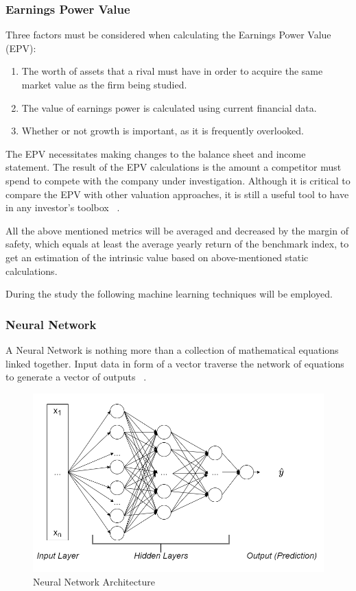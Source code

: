\documentclass{imc-inf}
\begin{document}
\subsubsection{Earnings Power Value}
Three factors must be considered when calculating the Earnings Power Value (EPV):

\begin{enumerate}
	\item The worth of assets that a rival must have in order to acquire the same market value as the firm being studied.
	\item The value of earnings power is calculated using current financial data.
	\item Whether or not growth is important, as it is frequently overlooked.
\end{enumerate}

The EPV necessitates making changes to the balance sheet and income statement. The result of the EPV calculations is the amount a competitor must spend to compete with the company under investigation. Although it is critical to compare the EPV with other valuation approaches, it is still a useful tool to have in any investor's toolbox ~\cite{epv}.

All the above mentioned metrics will be averaged and decreased by the margin of safety, which equals at least the average yearly return of the benchmark index, to get an estimation of the intrinsic value based on above-mentioned static calculations.

During the study the following machine learning techniques will be employed.

\subsubsection{Neural Network}
A Neural Network is nothing more than a collection of mathematical equations linked together. Input data in form of a vector traverse the network of equations to generate a vector of outputs ~\cite{nn_intro}.

\begin{figure}[h]
	\centering
	\includegraphics[width=1.0\textwidth]{resources/neural network architecture.png}
	\caption{Neural Network Architecture}
	\label{fig:neural_network}
\end{figure}
\end{document}
